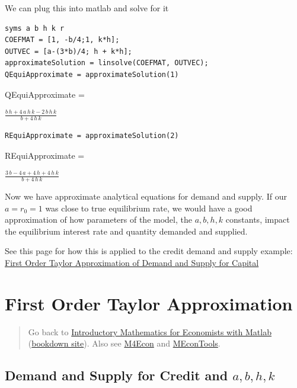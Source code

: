 \documentclass[
]{book}
\begin{document}
We can plug this into matlab and solve for it

\begin{verbatim}
syms a b h k r
COEFMAT = [1, -b/4;1, k*h];
OUTVEC = [a-(3*b)/4; h + k*h];
approximateSolution = linsolve(COEFMAT, OUTVEC);
QEquiApproximate = approximateSolution(1)
\end{verbatim}

QEquiApproximate =

\(\displaystyle \frac{b\,h+4\,a\,h\,k-2\,b\,h\,k}{b+4\,h\,k}\)

\begin{verbatim}
REquiApproximate = approximateSolution(2)
\end{verbatim}

REquiApproximate =

\(\displaystyle \frac{3\,b-4\,a+4\,h+4\,h\,k}{b+4\,h\,k}\)

Now we have approximate analytical equations for demand and supply. If
our \(a=r_0 =1\) was close to true equilibrium rate, we would have a good
approximation of how parameters of the model, the \(a,b,h,k\) constants,
impact the equilibrium interest rate and quantity demanded and supplied.

See this page for how this is applied to the credit demand and supply
example: \href{https://math4econ.github.io/matrix_application/demand_supply_taylor_approximate_capital.html}{First Order Taylor Approximation of Demand and Supply for
Capital}

\hypertarget{first-order-taylor-approximation-1}{%
\section{First Order Taylor Approximation}\label{first-order-taylor-approximation-1}}

\begin{quote}
Go back to \href{https://math4econ.github.io/}{Introductory Mathematics for Economists with Matlab} (\href{https://math4econ.github.io/bookdown}{bookdown site}). Also see \href{http://fanwangecon.github.io/M4Econ}{M4Econ} and \href{https://fanwangecon.github.io/MEconTools/}{MEconTools}.
\end{quote}

\hypertarget{demand-and-supply-for-credit-and-abhk}{%
\subsection{\texorpdfstring{Demand and Supply for Credit and \(a,b,h,k\)}{Demand and Supply for Credit and a,b,h,k}}\label{demand-and-supply-for-credit-and-abhk}}
\end{document}
